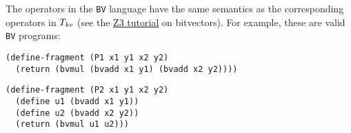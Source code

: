 \documentclass{handout}
\begin{document}
The operators in the \texttt{BV} language have the same semantics as the
corresponding operators in $T_\emph{bv}$ (see the
\href{http://rise4fun.com/z3/tutorial}{Z3 tutorial} on bitvectors). For example,
these are valid \texttt{BV} programs:

\lstset{language=lisp}
\begin{lstlisting}
(define-fragment (P1 x1 y1 x2 y2)
  (return (bvmul (bvadd x1 y1) (bvadd x2 y2))))
\end{lstlisting}

\begin{lstlisting}
(define-fragment (P2 x1 y1 x2 y2)
  (define u1 (bvadd x1 y1))
  (define u2 (bvadd x2 y2))
  (return (bvmul u1 u2)))
\end{lstlisting}
\end{document}
